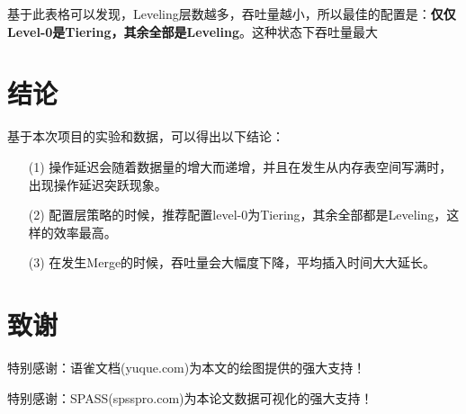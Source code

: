 \documentclass[fontset=windows]{article}
\begin{document}
\begin{table}[h]
  \centering
  \caption{吞吐量和Leveling层策略的关系}
\end{table}

基于此表格可以发现，Leveling层数越多，吞吐量越小，所以最佳的配置是：\textbf{仅仅Level-0是Tiering，其余全部是Leveling}。这种状态下吞吐量最大

\section{结论}
基于本次项目的实验和数据，可以得出以下结论：

\begin{itemize}
    \item [(1)] 操作延迟会随着数据量的增大而递增，并且在发生从内存表空间写满时，出现操作延迟突跃现象。
    \item [(2)] 
    配置层策略的时候，推荐配置level-0为Tiering，其余全部都是Leveling，这样的效率最高。
    \item [(3)] 
    在发生Merge的时候，吞吐量会大幅度下降，平均插入时间大大延长。
\end{itemize}


\section{致谢}

特别感谢：语雀文档(yuque.com)为本文的绘图提供的强大支持！

特别感谢：SPASS(spsspro.com)为本论文数据可视化的强大支持！
\end{document}
